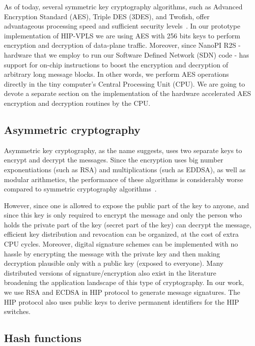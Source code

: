 As of today, several symmetric key cryptography algorithms, such as Advanced 
Encryption Standard (AES), Triple DES (3DES), and Twofish, offer advantageous 
processing speed and sufficient security levels~\cite{Stinson:Cryptography}. In our prototype implementation 
of HIP-VPLS we are using AES with 256 bits keys to perform encryption and 
decryption of data-plane traffic. Moreover, since NanoPI R2S - hardware that 
we employ to run our Software Defined Network (SDN) code - has support for 
on-chip instructions to boost the encryption and decryption of arbitrary long 
message blocks. In other words, we perform AES operations directly in the tiny 
computer's Central Processing Unit (CPU). We are going to devote a separate 
section on the implementation of the hardware accelerated AES encryption and 
decryption routines by the CPU.

\subsection{Asymmetric cryptography}

Asymmetric key cryptography, as the name suggests, uses two separate keys to 
encrypt and decrypt the messages. Since the encryption uses big number 
exponentiations (such as RSA) and multiplications (such as EDDSA), as well 
as modular arithmetics, the performance of these algorithms is considerably 
worse compared to symmetric cryptography algorithms~\cite{Stinson:Cryptography}. 

However, since one is allowed to expose the public part of the key to anyone, 
and since this key is only required to encrypt the message and only the person 
who holds the private part of the key (secret part of the key) can decrypt the 
message, efficient key distribution and revocation can be organized, at the 
cost of extra CPU cycles. Moreover, digital signature schemes can be implemented 
with no hassle by encrypting the message with the private key and then making 
decryption plausible only with a public key (exposed to everyone). Many distributed 
versions of signature/encryption also exist in the literature broadening the 
application landscape of this type of cryptography. In our work, we use RSA and 
ECDSA in HIP protocol to generate message signatures. The HIP protocol also uses 
public keys to derive permanent identifiers for the HIP switches.
 

\subsection{Hash functions}


